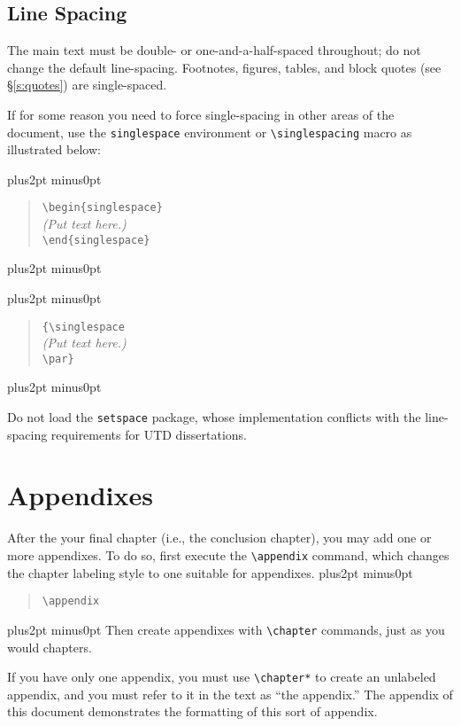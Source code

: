 \documentclass[doublespacing]{utdthesis}
\providecommand{\hyperref}[2][]{#2}
\newenvironment{exampleclasscode}
 {\parindent=1cm\vskip0pt plus2pt minus0pt\begin{verse}}
 {\end{verse}\vskip0pt plus2pt minus0pt}
\begin{document}
\subsection{Line Spacing}
\label{s:spacing}

The main text must be double- or one-and-a-half-spaced throughout; do not
change the default line-spacing.
Footnotes, figures, tables, and block quotes (see \S\ref{s:quotes}) are
single-spaced.

If for some reason you need to force single-spacing in other areas of the
document, use the \verb|singlespace| environment or \verb|\singlespacing| macro
as illustrated below:

\begin{exampleclasscode}
\verb|\begin{singlespace}| \\
\textit{(Put text here.)} \\
\verb|\end{singlespace}|
\end{exampleclasscode}

\begin{exampleclasscode}
\verb|{\singlespace | \\
\textit{(Put text here.)} \\
\verb|\par}|
\end{exampleclasscode}

\noindent
Do not load the \verb|setspace| package, whose implementation conflicts with
the line-spacing requirements for UTD dissertations.

\section{Appendixes}
\label{s:appendixes}

After the your final chapter (i.e., the conclusion chapter), you may add one
or more appendixes.
To do so, first execute the \verb|\appendix| command, which changes the chapter
labeling style to one suitable for appendixes.
\begin{exampleclasscode}
\verb|\appendix|
\end{exampleclasscode}
Then create appendixes with \verb|\chapter| commands, just as you would
chapters.

If you have only one appendix, you must use \verb|\chapter*| to create an
unlabeled appendix, and you must refer to it in the text as ``the appendix.''
The \hyperref[a:other]{appendix} of this document demonstrates the formatting
of this sort of appendix.
\end{document}
